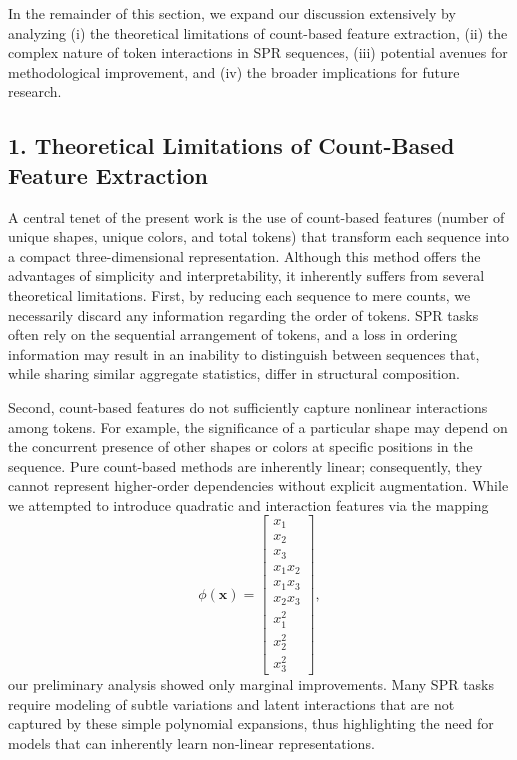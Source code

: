 \documentclass{article}
\begin{document}
In the remainder of this section, we expand our discussion extensively by analyzing (i) the theoretical limitations of count-based feature extraction, (ii) the complex nature of token interactions in SPR sequences, (iii) potential avenues for methodological improvement, and (iv) the broader implications for future research.

\subsection*{1. Theoretical Limitations of Count-Based Feature Extraction}
A central tenet of the present work is the use of count-based features (number of unique shapes, unique colors, and total tokens) that transform each sequence into a compact three-dimensional representation. Although this method offers the advantages of simplicity and interpretability, it inherently suffers from several theoretical limitations. First, by reducing each sequence to mere counts, we necessarily discard any information regarding the order of tokens. SPR tasks often rely on the sequential arrangement of tokens, and a loss in ordering information may result in an inability to distinguish between sequences that, while sharing similar aggregate statistics, differ in structural composition.

Second, count-based features do not sufficiently capture nonlinear interactions among tokens. For example, the significance of a particular shape may depend on the concurrent presence of other shapes or colors at specific positions in the sequence. Pure count-based methods are inherently linear; consequently, they cannot represent higher-order dependencies without explicit augmentation. While we attempted to introduce quadratic and interaction features via the mapping
\[
\phi(\mathbf{x}) = \begin{bmatrix} x_1 \\ x_2 \\ x_3 \\ x_1x_2 \\ x_1x_3 \\ x_2x_3 \\ x_1^2 \\ x_2^2 \\ x_3^2 \end{bmatrix},
\]
our preliminary analysis showed only marginal improvements. Many SPR tasks require modeling of subtle variations and latent interactions that are not captured by these simple polynomial expansions, thus highlighting the need for models that can inherently learn non-linear representations.
\end{document}
